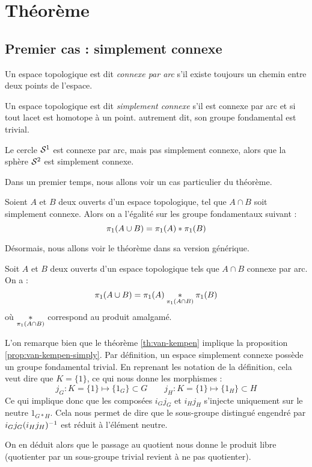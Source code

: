 \documentclass[hidelinks, 10pt]{article}
\begin{document}
\section{Théorème}
\subsection{Premier cas : simplement connexe}
\begin{definition}
Un espace topologique est dit \emph{connexe par arc} s'il existe toujours un chemin entre deux points de l'espace.

Un espace topologique est dit \emph{simplement connexe} s'il est connexe par arc et si tout lacet est homotope à un point. autrement dit, son groupe fondamental est trivial.
\end{definition}

\begin{exemple}
Le cercle $\mathcal{S}^{1}$ est connexe par arc, mais pas simplement connexe, alors que la sphère $\mathcal{S}^{2}$ est simplement connexe.
\end{exemple}

Dans un premier temps, nous allons voir un cas particulier du théorème.
\begin{proposition}\label{prop:van-kempen-simply}
Soient $A$ et $B$ deux ouverts d'un espace topologique, tel que $A\cap B$ soit simplement connexe. Alors on a l'égalité sur les groupe fondamentaux suivant : \[\pi_1(A\cup B)=\pi_1(A)\ast\pi_1(B)\]
\end{proposition}


Désormais, nous allons voir le théorème dans sa version générique.
\begin{theorem}\label{th:van-kempen}
Soit $A$ et $B$ deux ouverts d'un espace topologique tels que $A\cap B$ connexe par arc. On a : \[\pi_1(A\cup B)=\pi_1(A)\underset{\pi_1(A\cap B)}{\ast}\pi_1(B)\]où $\underset{\pi_1(A\cap B)}{\ast}$ correspond au produit amalgamé.
\end{theorem}

\begin{remark}
L'on remarque bien que le théorème \ref{th:van-kempen} implique la proposition \ref{prop:van-kempen-simply}. Par définition, un espace simplement connexe possède un groupe fondamental trivial. En reprenant les notation de la définition, cela veut dire que $K=\{1\}$, ce qui nous donne les morphismes : \[j_G:K=\{1\}\mapsto\{1_G\}\subset G\qquad j_H:K=\{1\}\mapsto\{1_H\}\subset H\]Ce qui implique donc que les composées $i_Gj_G$ et $i_Hj_H$ s'injecte uniquement sur le neutre $1_{G\ast H}$. Cela nous permet de dire que le sous-groupe distingué engendré par $i_Gj_G(i_Hj_H)^{-1}$ est réduit à l'élément neutre. 

On en déduit alors que le passage au quotient nous donne le produit libre (quotienter par un sous-groupe trivial revient à ne pas quotienter).
\end{remark}
\end{document}
